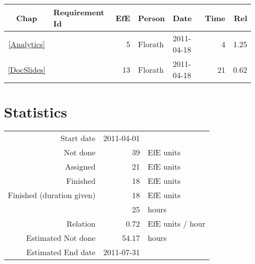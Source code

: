 {\small \begin{longtable}{|c|p{5.5cm}||r|l|l|r|r|} \hline
\textbf{Chap} & \textbf{Requirement Id} & \textbf{EfE} & \textbf{Person} & \textbf{Date} & \textbf{Time} & \textbf{Rel} \\ \hline\endhead
\ref{Analytics} & \nameref{Analytics} & 5 & Florath & 2011-04-18 & 4 & 1.25 \\ \hline
\ref{DocSlides} & \nameref{DocSlides} & 13 & Florath & 2011-04-18 & 21 & 0.62 \\ \hline
\end{longtable}}\section{Statistics}
\begin{longtable}{rrl}
Start date & 2011-04-01 & \\ 
Not done & 39 & EfE units \\ 
Assigned & 21 & EfE units \\ 
Finished & 18 & EfE units \\ 
Finished (duration given) & 18 & EfE units \\ 
 & 25 & hours \\ 
Relation & 0.72 & EfE units / hour \\ 
Estimated Not done & 54.17 & hours \\ 
Estimated End date & 2011-07-31 & \\ 
\end{longtable}